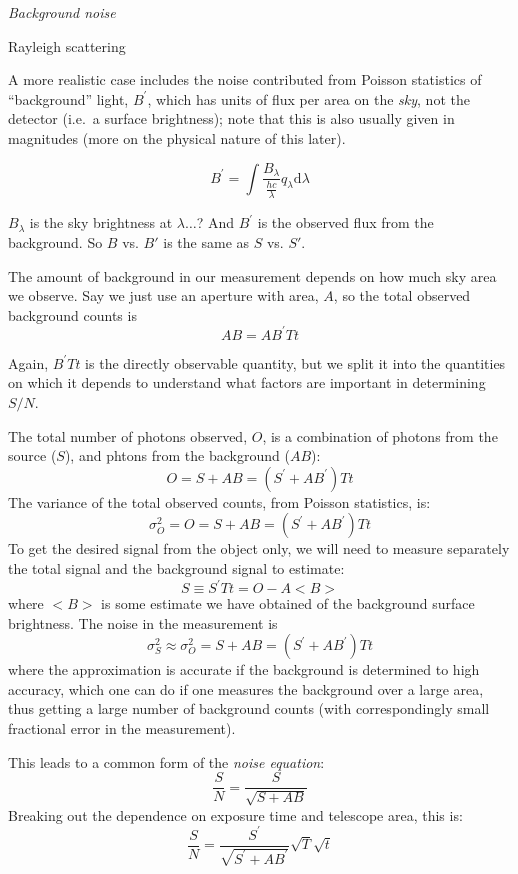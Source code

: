 \documentclass[12pt]{article}
\begin{document}
\textcolor{om}{\emph{}}

\emph{Background noise}

\textcolor{myBlue}{Rayleigh scattering}

A more realistic case includes the noise contributed from Poisson
statistics of ``background'' light, $B^{\prime}$,
which has units of flux per area
on the \emph{sky}, not the detector
(i.e.\ a surface brightness); note that this is also usually
given in magnitudes (more on the physical nature of
this later).

    $$ B^{\prime} = \int \frac{B_{\lambda}}{\frac{hc}{\lambda}}
       q_{\lambda}\textrm{d}\lambda $$

\textcolor{myBlue}{$B_{\lambda}$ is the sky brightness at $\lambda
\ldots$? And $B^{\prime}$ is the observed flux from the background.
So $B$ vs. $B'$ is the same as $S$ vs. $S'$.}

The amount of background in our measurement depends on
how much sky area we observe. Say we just
use an aperture with area, $A$, so the total observed background counts
is
    $$ AB = AB^{\prime}Tt $$

Again, $B^{\prime}Tt$ is the directly observable quantity,
but we split it into the quantities on which it depends to understand
what factors are important in determining $S/N$.

The total number of photons observed, $O$, is a combination of
photons from the source ($S$), and phtons from the background ($AB$):
    $$ O = S + AB = (S^{\prime} + AB^{\prime})Tt $$
The variance of the total observed counts, from Poisson statistics,
is:
    $$ \sigma^{2}_O = O =  S + AB = (S^{\prime} + AB^{\prime})Tt $$
To get the desired signal from the object only, we will need to
measure separately the total signal and the background signal to
estimate:
    $$ S \equiv S^{\prime}Tt = O-A <B> $$
where $<B>$ is some estimate we have obtained of the background
surface brightness. The noise in the measurement is
    $$ \sigma^{2}_S \approx \sigma^{2}_O =
    S + AB = (S^{\prime} + AB^{\prime})Tt $$
where the approximation is accurate if the background is determined to
high accuracy, which one can do if one measures the background over a
large area, thus getting a large number of background counts (with
correspondingly small fractional error in the measurement).

This leads to a common form of the \emph{noise equation}:
    $$ \frac{S}{N} = \frac{S}{\sqrt{S+AB}}  $$
Breaking out the dependence on exposure time and telescope area, this
is:
    $$ \frac{S}{N} = \frac{S^{\prime}}
    {\sqrt{S^{\prime}+AB^{\prime}}}
    \sqrt{T}\sqrt{t}$$
\end{document}
